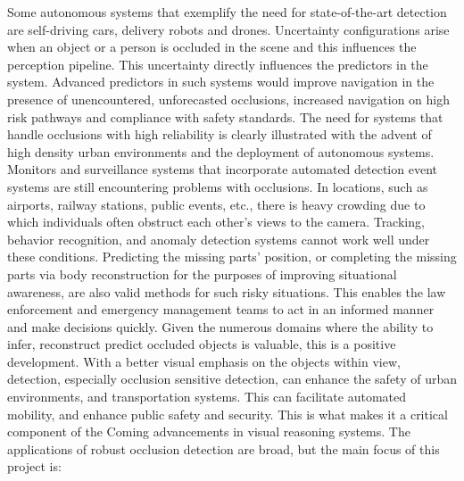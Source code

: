 \documentclass[12pt,a4paper]{report}
\theoremstyle{definition}
\theoremstyle{remark}
\begin{document}
Some autonomous systems that exemplify the need for state-of-the-art detection are self-driving cars, delivery robots and drones. Uncertainty configurations arise when an object or a person is occluded in the scene and this influences the perception pipeline. This uncertainty directly influences the predictors in the system. Advanced predictors in such systems would improve navigation in the presence of unencountered, unforecasted occlusions, increased navigation on high risk pathways and compliance with safety standards. The need for systems that handle occlusions with high reliability is clearly illustrated with the advent of high density urban environments and the deployment of autonomous systems. Monitors and surveillance systems that incorporate automated detection event systems are still encountering problems with occlusions. In locations, such as airports, railway stations, public events, etc., there is heavy crowding due to which individuals often obstruct each other’s views to the camera. Tracking, behavior recognition, and anomaly detection systems cannot work well under these conditions. Predicting the missing parts' position, or completing the missing parts via body reconstruction for the purposes of improving situational awareness, are also valid methods for such risky situations. This enables the law enforcement and emergency management teams to act in an informed manner and make decisions quickly. Given the numerous domains where the ability to infer, reconstruct predict occluded objects is valuable, this is a positive development. With a better visual emphasis on the objects within view, detection, especially occlusion sensitive detection, can enhance the safety of urban environments, and transportation systems. This can facilitate automated mobility, and enhance public safety and security. This is what makes it a critical component of the Coming advancements in visual reasoning systems. The applications of robust occlusion detection are broad, but the main focus of this project is:
\end{document}
